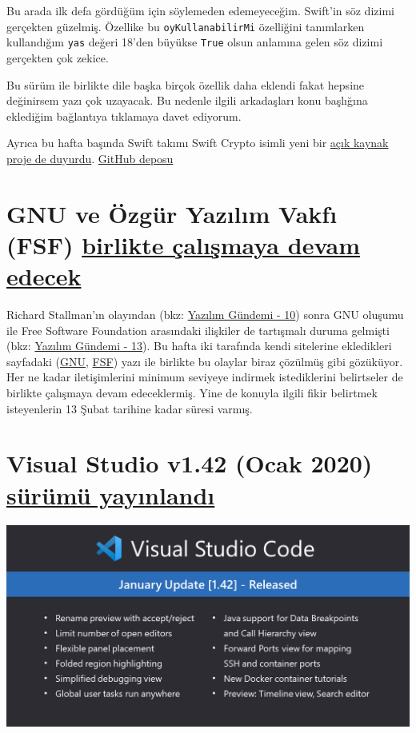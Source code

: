 \documentclass[11pt]{article}
\begin{document}
Bu arada ilk defa gördüğüm için söylemeden edemeyeceğim. Swift'in söz dizimi
gerçekten güzelmiş. Özellike bu \texttt{oyKullanabilirMi} özelliğini tanımlarken
kullandığım \texttt{yas} değeri 18'den büyükse \texttt{True} olsun anlamına gelen söz dizimi
gerçekten çok zekice.

Bu sürüm ile birlikte dile başka birçok özellik daha eklendi fakat hepsine
değinirsem yazı çok uzayacak. Bu nedenle ilgili arkadaşları konu başlığına
eklediğim bağlantıya tıklamaya davet ediyorum.

Ayrıca bu hafta başında Swift takımı Swift Crypto isimli yeni bir \href{https://swift.org/blog/crypto/}{açık kaynak
proje de duyurdu}. \href{https://github.com/apple/swift-crypto}{GitHub deposu}
\section{GNU ve Özgür Yazılım Vakfı (FSF) \href{https://www.gnu.org/gnu/2020-announcement-1.html}{birlikte çalışmaya devam edecek}}
\label{sec:org6961702}
Richard Stallman'ın olayından (bkz: \href{../../2019/10/yazilim-gundemi-10.pdf}{Yazılım Gündemi - 10}) sonra GNU oluşumu
ile Free Software Foundation arasındaki ilişkiler de tartışmalı duruma
gelmişti (bkz: \href{../../2019/13/yazilim-gundemi-13.pdf}{Yazılım Gündemi - 13}). Bu hafta iki tarafında kendi sitelerine
ekledikleri sayfadaki (\href{https://www.gnu.org/gnu/2020-announcement-1.html}{GNU}, \href{https://www.fsf.org/news/gnu-fsf-cooperation-update}{FSF}) yazı ile birlikte bu olaylar biraz çözülmüş
gibi gözüküyor. Her ne kadar iletişimlerini minimum seviyeye indirmek
istediklerini belirtseler de birlikte çalışmaya devam edeceklermiş. Yine de
konuyla ilgili fikir belirtmek isteyenlerin 13 Şubat tarihine kadar süresi
varmış.
\section{Visual Studio v1.42 (Ocak 2020) \href{https://code.visualstudio.com/updates/v1\_42}{sürümü yayınlandı}}
\label{sec:orgdf54201}
\begin{center}
\includegraphics[width=.9\linewidth]{gorseller/vscode-142.png}
\end{center}
\end{document}
